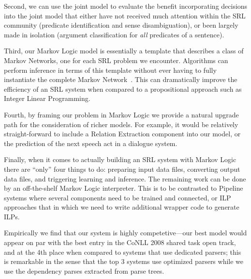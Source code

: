 Second, we can use the joint model to evaluate the benefit incorporating
decisions into the joint model that either have not received much
attention within the SRL community (predicate identification and sense
disambiguation), or been largely made in isolation (argument classification
for \emph{all} predicates of a sentence). 

Third, our Markov Logic model is essentially a template that describes
a class of Markov Networks, one for each SRL problem we encounter.
Algorithms can perform inference in terms of this template without
ever having to fully instantiate the complete Markov
Network~\citep{riedel08improving}. This can dramatically improve the efficiency of an SRL system when
compared to a propositional approach such as Integer Linear Programming.

Fourth, by framing our problem in Markov Logic we provide a natural
upgrade path for the consideration of richer models. For example, it
would be relatively straight-forward to include a Relation Extraction
component into our model, or the prediction of the next speech act in a
dialogue system.

Finally, when it comes to actually building an SRL system with Markov
Logic 
there are ``only''
four things
to do: preparing input data files, converting
output data files, and triggering learning and inference. The remaining
work can be done by an off-the-shelf Markov Logic interpreter. This
is to be contrasted to Pipeline systems where several components need
to be trained and connected, or ILP approaches that in which we need
to write additional wrapper code to generate ILPs.

Empirically we find that our system is highly competetive---our best
model would appear on par with the best entry in the CoNLL 2008
shared task open track, and at the 4th place when compared to systems
that use dedicated parsers; this is remarkable in the sense that the
top 3 systems use optimized parsers while we use the dependency parses
extracted from \citet{charniak00amaximum} parse trees.

